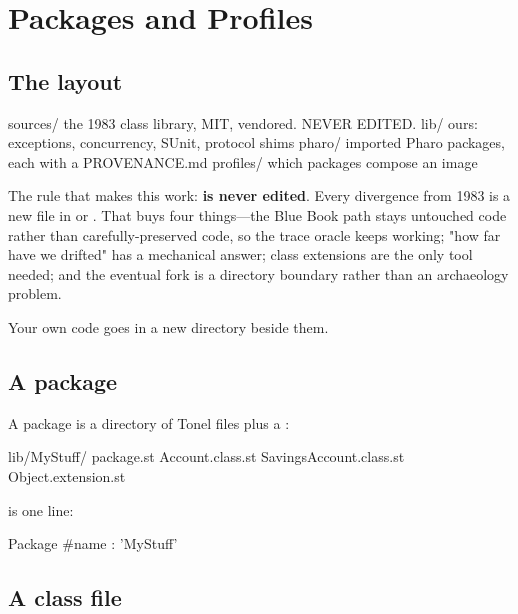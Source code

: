 \chapter{Packages and Profiles}
\label{ch:packages}


\section{The layout}

\begin{plain}
sources/     the 1983 class library, MIT, vendored.  NEVER EDITED.
lib/         ours: exceptions, concurrency, SUnit, protocol shims
pharo/       imported Pharo packages, each with a PROVENANCE.md
profiles/    which packages compose an image
\end{plain}

The rule that makes this work: \textbf{ is never edited}. Every
divergence from 1983 is a new file in  or . That buys
four things---the Blue Book path stays untouched code rather than
carefully-preserved code, so the trace oracle keeps working; "how far have we
drifted" has a mechanical answer; class extensions are the only tool needed;
and the eventual fork is a directory boundary rather than an archaeology
problem.

Your own code goes in a new directory beside them.

\section{A package}

A package is a directory of Tonel files plus a :

\begin{plain}
lib/MyStuff/
    package.st
    Account.class.st
    SavingsAccount.class.st
    Object.extension.st
\end{plain}

 is one line:

\begin{st}
Package { #name : 'MyStuff' }
\end{st}

\section{A class file}

